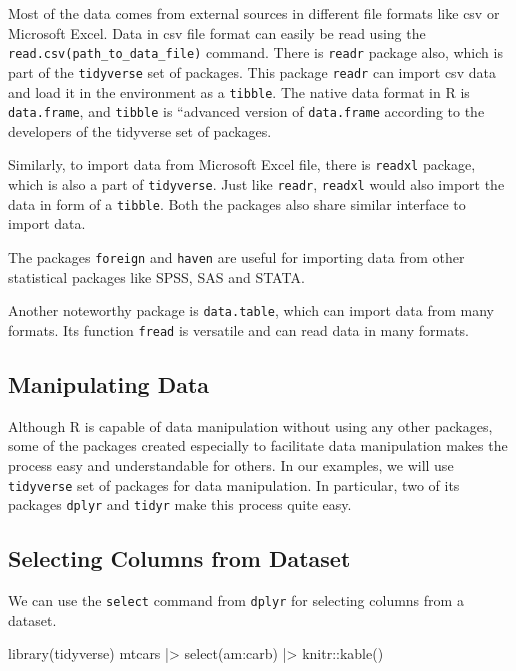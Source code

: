\documentclass[
  letterpaper,
  paper =a4,
  twoside,
  openright,
  headsepline,
  footsepline,
  listof = totocnumbered,
  chapterprefix = true,
  firstiscover]{scrbook}
\newenvironment{Shaded}{\begin{snugshade}}{\end{snugshade}}
\newcommand{\FunctionTok}[1]{\textcolor[rgb]{0.28,0.35,0.67}{#1}}
\newcommand{\NormalTok}[1]{\textcolor[rgb]{0.00,0.23,0.31}{#1}}
\newcommand{\SpecialCharTok}[1]{\textcolor[rgb]{0.37,0.37,0.37}{#1}}
\begin{document}
Most of the data comes from external sources in different file formats
like csv or Microsoft Excel. Data in csv file format can easily be read
using the \texttt{read.csv(path\_to\_data\_file)} command. There is
\texttt{readr} package also, which is part of the \texttt{tidyverse} set
of packages. This package \texttt{readr} can import csv data and load it
in the environment as a \texttt{tibble}. The native data format in R is
\texttt{data.frame}, and \texttt{tibble} is ``advanced version of
\texttt{data.frame} according to the developers of the tidyverse set of
packages.

Similarly, to import data from Microsoft Excel file, there is
\texttt{readxl} package, which is also a part of \texttt{tidyverse}.
Just like \texttt{readr}, \texttt{readxl} would also import the data in
form of a \texttt{tibble}. Both the packages also share similar
interface to import data.

The packages \texttt{foreign} and \texttt{haven} are useful for
importing data from other statistical packages like SPSS, SAS and STATA.

Another noteworthy package is \texttt{data.table}, which can import data
from many formats. Its function \texttt{fread} is versatile and can read
data in many formats.

\hypertarget{manipulating-data}{%
\subsection{Manipulating Data}\label{manipulating-data}}

Although R is capable of data manipulation without using any other
packages, some of the packages created especially to facilitate data
manipulation makes the process easy and understandable for others. In
our examples, we will use \texttt{tidyverse} set of packages for data
manipulation. In particular, two of its packages \texttt{dplyr} and
\texttt{tidyr} make this process quite easy.

\hypertarget{selecting-columns-from-dataset}{%
\subsection{Selecting Columns from
Dataset}\label{selecting-columns-from-dataset}}

We can use the \texttt{select} command from \texttt{dplyr} for selecting
columns from a dataset.

\begin{Shaded}
\begin{Highlighting}[numbers=left,,]
\FunctionTok{library}\NormalTok{(tidyverse)}
\NormalTok{mtcars }\SpecialCharTok{|\textgreater{}} \FunctionTok{select}\NormalTok{(am}\SpecialCharTok{:}\NormalTok{carb) }\SpecialCharTok{|\textgreater{}}\NormalTok{ knitr}\SpecialCharTok{::}\FunctionTok{kable}\NormalTok{()}
\end{Highlighting}
\end{Shaded}
\end{document}
